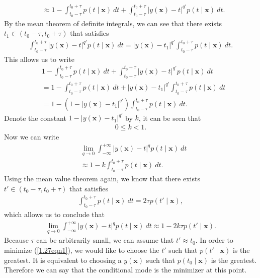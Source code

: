 \begin{answer}{}
\begin{align}
		&\approx 1 - \int_{t_0 - \tau}^{t_0 + \tau} p(t \mid \bm{x})\ dt + \int_{t_0 - \tau}^{t_0 + \tau} \lvert y(\bm{x}) - t \rvert^{q'} p(t \mid \bm{x})\ dt.
	\end{align}
	By the mean theorem of definite integrals, we can see that there exists $t_1 \in (t_0 - \tau, t_0 + \tau)$ that satisfies
	\begin{align}
		\int_{t_0 - \tau}^{t_0 + \tau} \lvert y(\bm{x}) - t \rvert^{q'} p(t \mid \bm{x})\ dt = \lvert y(\bm{x}) - t_1 \rvert^{q'} \int_{t_0 - \tau}^{t_0 + \tau} p(t \mid \bm{x})\ dt.
	\end{align}
	This allows us to write
	\begin{align}
		&1 - \int_{t_0 - \tau}^{t_0 + \tau} p(t \mid \bm{x})\ dt + \int_{t_0 - \tau}^{t_0 + \tau} \lvert y(\bm{x}) - t \rvert^{q'} p(t \mid \bm{x})\ dt\\
		&= 1 - \int_{t_0 - \tau}^{t_0 + \tau} p(t \mid \bm{x})\ dt + \lvert y(\bm{x}) - t_1 \rvert^{q'} \int_{t_0 - \tau}^{t_0 + \tau} p(t \mid \bm{x})\ dt\\
		&= 1 - (1 - \lvert y(\bm{x}) - t_1 \rvert^{q'})\int_{t_0 - \tau}^{t_0 + \tau} p(t \mid \bm{x})\ dt.
	\end{align}
	Denote the constant $1 - \lvert y(\bm{x}) - t_1 \rvert^{q'}$ by $k$, it can be seen that
	\begin{align}
		0 \leq k < 1.
	\end{align}
	Now we can write
	\begin{align}
		&\lim_{q \rightarrow 0} \int_{-\infty}^{+\infty} \lvert y(\bm{x}) - t \rvert^q p(t \mid \bm{x})\ dt\\
		&\approx 1 - k\int_{t_0 - \tau}^{t_0 + \tau} p(t \mid \bm{x})\ dt. \label{1.27eqn2}
	\end{align}
	Using the mean value theorem again, we know that there exists $t' \in (t_0 - \tau, t_0 + \tau)$ that satisfies
	\begin{align}
		\int_{t_0 - \tau}^{t_0 + \tau} p(t \mid \bm{x})\ dt = 2\tau p(t' \mid \bm{x}),
	\end{align}
	which allows us to conclude that
	\begin{align}\label{1.27eqn3}
		\lim_{q \rightarrow 0} \int_{-\infty}^{+\infty} \lvert y(\bm{x}) - t \rvert^q p(t \mid \bm{x})\ dt \approx 1 - 2k\tau p(t' \mid \bm{x}).
	\end{align}
	Because $\tau$ can be arbitrarily small, we can assume that $t' \approx t_0$. In order to minimize (\ref{1.27eqn1}), we would like to choose the $t'$ such that $p(t' \mid \bm{x})$ is the greatest. It is equivalent to choosing a $y(\bm{x})$ such that $p(t_0 \mid \bm{x})$ is the greatest. Therefore we can say that the conditional mode is the minimizer at this point.
\end{answer}

